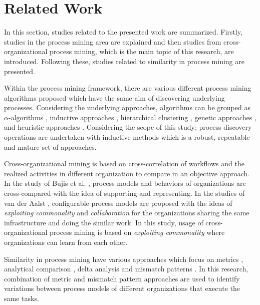 \section{Related Work}
\label{sec:relatedwork}

In this section, studies related to the presented work are summarized. Firstly, studies in the process mining area are explained and then studies from cross-organizational process mining, which is the main topic of this research, are introduced. Following these, studies related to similarity in process mining are presented.

Within the process mining framework, there are various different process mining algorithms proposed which have the same aim of discovering underlying processes. Considering the underlying approaches, algorithms can be grouped as $\alpha$-algorithms \cite{van2004workflow,de2004process}, inductive approaches \cite{herbst1998integrating,herbst2000dealing}, hierarchical clustering \cite{greco2005mining}, genetic approaches \cite{van2005genetic,esgin2010hybrid}, and heuristic approaches \cite{esgin2009hybrid}. Considering the scope of this study; process discovery operations are undertaken with inductive methods which is a robust, repeatable and mature set of approaches.

Cross-organizational mining is based on cross-correlation of workflows and the realized activities in different organization to compare in an objective approach. In the study of Bujis et al. \cite{buijs2012towards}, process models and behaviors of organizations are cross-compared with the idea of supporting and representing. In the studies of van der Aalst \cite{van2011business,van2011intra}, configurable process models are proposed with the ideas of \textit{exploiting commonality} and \textit{collaboration} for the organizations sharing the same infrastructure and doing the similar work. In this study, usage of cross-organizational process mining is based on \textit{exploiting commonality} where organizations can learn from each other.

Similarity in process mining have various approaches which focus on metrics \cite{dijkman2011similarity}, analytical comparison \cite{buijs2014comparing}, delta analysis \cite{esgin2011delta,esgin2013sequence} and mismatch patterns \cite{dijkman2007mismatch}. In this research, combination of metric and mismatch pattern approaches are used to identify variations between process models of different organizations that execute the same tasks.